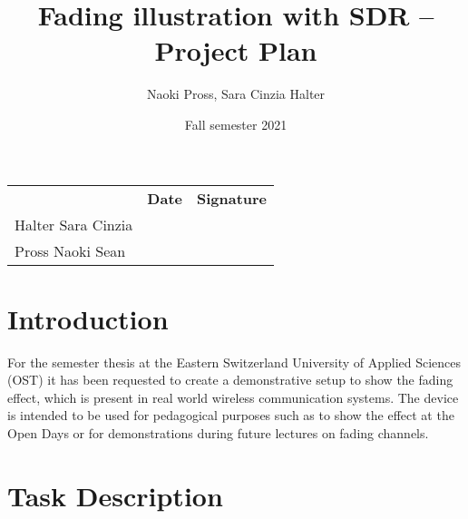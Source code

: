 \documentclass[a4paper, twosided, 11pt]{scrartcl}
\title{Fading illustration with SDR -- Project Plan}
\author{Naoki Pross, Sara Cinzia Halter}
\date{Fall semester 2021}
\begin{document}
\thispagestyle{plain}

\maketitle
\tableofcontents
\vfill
{
	\renewcommand{\arraystretch}{2}
	\begin{tabularx}{\textwidth}{lp{}X}
		                   & \bfseries Date & \bfseries Signature\\
		Halter Sara Cinzia & \hrulefill & \hrulefill \\
		Pross Naoki Sean   & \hrulefill & \hrulefill \\
	\end{tabularx}
}
\cleardoublepage

\setcounter{page}{1}

\section{Introduction}

For the semester thesis at the Eastern Switzerland University of Applied Sciences (OST) it has been requested to create a demonstrative setup to show the fading effect, which is present in real world wireless communication systems.
The device is intended to be used for pedagogical purposes such as to show the effect at the Open Days or for demonstrations during future lectures on fading channels.

\section{Task Description}
\end{document}

